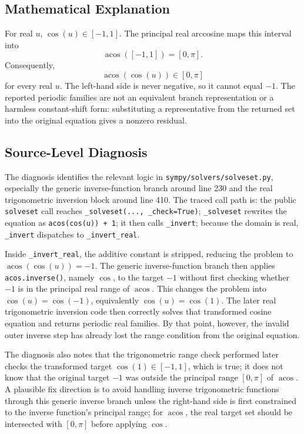 \documentclass[11pt]{article}
\begin{document}
\subsection{Mathematical Explanation}

For real \(u\), \(\cos(u)\in[-1,1]\).  The principal real arccosine maps
this interval into
\[
  \operatorname{acos}([-1,1]) = [0,\pi].
\]
Consequently,
\[
  \operatorname{acos}(\cos(u)) \in [0,\pi]
\]
for every real \(u\).  The left-hand side is never negative, so it cannot
equal \(-1\).  The reported periodic families are not an equivalent branch
representation or a harmless constant-shift form: substituting a representative
from the returned set into the original equation gives a nonzero residual.

\subsection{Source-Level Diagnosis}

The diagnosis identifies the relevant logic in \nolinkurl{sympy/solvers/solveset.py},
especially the generic inverse-function branch around line 230 and the real
trigonometric inversion block around line 410.  The traced call path is:
the public \texttt{solveset} call reaches \texttt{\_solveset(..., \_check=True)};
\texttt{\_solveset} rewrites the equation as \texttt{acos(cos(u)) + 1}; it
then calls \texttt{\_invert}; because the domain is real, \texttt{\_invert}
dispatches to \texttt{\_invert\_real}.

Inside \texttt{\_invert\_real}, the additive constant is stripped, reducing
the problem to \(\operatorname{acos}(\cos(u))=-1\).  The generic inverse-function branch
then applies \texttt{acos.inverse()}, namely \(\cos\), to the target \(-1\)
without first checking whether \(-1\) is in the principal real range of
\(\operatorname{acos}\).  This changes the problem into \(\cos(u)=\cos(-1)\), equivalently
\(\cos(u)=\cos(1)\).  The later real trigonometric inversion code then
correctly solves that transformed cosine equation and returns periodic real
families.  By that point, however, the invalid outer inverse step has already
lost the range condition from the original equation.

The diagnosis also notes that the trigonometric range check performed later
checks the transformed target \(\cos(1)\in[-1,1]\), which is true; it does
not know that the original target \(-1\) was outside the principal range
\([0,\pi]\) of \(\operatorname{acos}\).  A plausible fix direction is to avoid handling
inverse trigonometric functions through this generic inverse branch unless the
right-hand side is first constrained to the inverse function's principal range;
for \(\operatorname{acos}\), the real target set should be intersected with \([0,\pi]\)
before applying \(\cos\).
\end{document}
